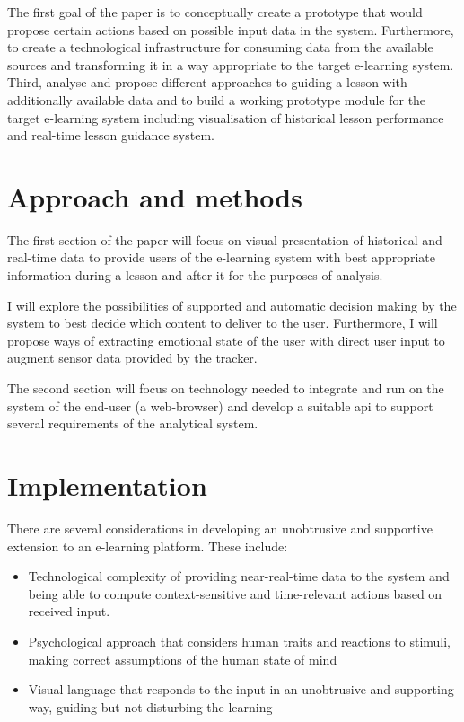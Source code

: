 The first goal of the paper is to conceptually create a prototype that would propose certain actions based on possible input data in the system. Furthermore, to create a technological infrastructure for consuming data from the available sources and transforming it in a way appropriate to the target e-learning system. Third, analyse and propose different approaches to guiding a lesson with additionally available data and to build a working prototype module for the target e-learning system including visualisation of historical lesson performance and real-time lesson guidance system.

\section{Approach and methods}

The first section of the paper will focus on visual presentation of historical and real-time data to provide users of the e-learning system with best appropriate information during a lesson and after it for the purposes of analysis.

I will explore the possibilities of supported and automatic decision making by the system to best decide which content to deliver to the user. Furthermore, I will propose ways of extracting emotional state of the user with direct user input to augment sensor data provided by the tracker.

The second section will focus on technology needed to integrate and run on the system of the end-user (a web-browser) and develop a suitable api to support several requirements of the analytical system.

\section{Implementation}

There are several considerations in developing an unobtrusive and supportive extension to an e-learning platform. These include:

\begin{itemize}
	\item Technological complexity of providing near-real-time data to the system and being able to compute context-sensitive and time-relevant actions based on received input.
	\item Psychological approach that considers human traits and reactions to stimuli, making correct assumptions of the human state of mind
	\item Visual language that responds to the input in an unobtrusive and supporting way, guiding but not disturbing the learning  \cite{dix2003human,few2013information}
\end{itemize}



